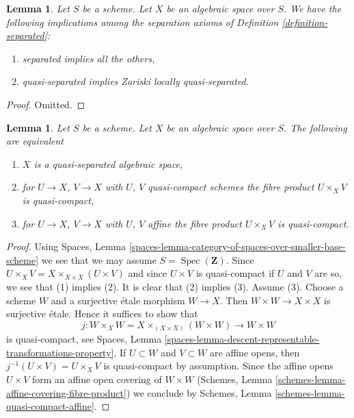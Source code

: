 \documentclass{stacks-project}
\theoremstyle{plain}
\newtheorem{lemma}[subsection]{Lemma}
\theoremstyle{definition}
\theoremstyle{remark}
\numberwithin{equation}{subsection}
\def\Spec{\mathop{\mathrm{Spec}}}
\begin{document}
\begin{lemma}
\label{lemma-trivial-implications}
Let $S$ be a scheme.
Let $X$ be an algebraic space over $S$.
We have the following implications among the separation axioms
of Definition \ref{definition-separated}:
\begin{enumerate}
\item separated implies all the others,
\item quasi-separated implies Zariski locally quasi-separated.
\end{enumerate}
\end{lemma}

\begin{proof}
Omitted.
\end{proof}

\begin{lemma}
\label{lemma-characterize-quasi-separated}
Let $S$ be a scheme. Let $X$ be an algebraic space over $S$.
The following are equivalent
\begin{enumerate}
\item $X$ is a quasi-separated algebraic space,
\item for $U \to X$, $V \to X$ with $U$, $V$ quasi-compact schemes
the fibre product $U \times_X V$ is quasi-compact,
\item for $U \to X$, $V \to X$ with $U$, $V$ affine
the fibre product $U \times_X V$ is quasi-compact.
\end{enumerate}
\end{lemma}

\begin{proof}
Using Spaces, Lemma
\ref{spaces-lemma-category-of-spaces-over-smaller-base-scheme}
we see that we may assume $S = \Spec(\mathbf{Z})$.
Since $U \times_X V = X \times_{X \times X} (U \times V)$
and since $U \times V$ is quasi-compact if $U$ and $V$ are so,
we see that (1) implies (2). It is clear that (2) implies (3).
Assume (3). Choose a scheme $W$ and a surjective \'etale morphism
$W \to X$. Then $W \times W \to X \times X$ is surjective \'etale.
Hence it suffices to show that
$$
j : W \times_X W = X \times_{(X \times X)} (W \times W) \to W \times W
$$
is quasi-compact, see Spaces, Lemma
\ref{spaces-lemma-descent-representable-transformations-property}.
If $U \subset W$ and $V \subset W$ are affine opens, then
$j^{-1}(U \times V) = U \times_X V$ is quasi-compact by assumption.
Since the affine opens $U \times V$ form an affine open covering of
$W \times W$ (Schemes, Lemma \ref{schemes-lemma-affine-covering-fibre-product})
we conclude by
Schemes, Lemma \ref{schemes-lemma-quasi-compact-affine}.
\end{proof}
\end{document}
